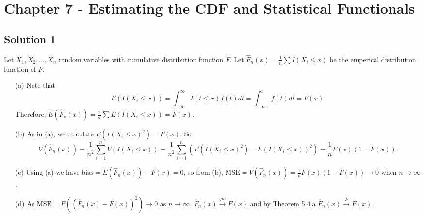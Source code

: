 \section*{Chapter 7 - Estimating the CDF and Statistical Functionals}

\subsection*{Solution 1}

Let $X_1, X_2, ..., X_n$ random variables with cumulative distribution function $F$.
Let $\hat{F}_n(x) = \frac{1}{n} \sum I(X_i \leq x)$ be the emperical distribution function of $F$.
\begin{itemize}
    \item[(a)] Note that
        \begin{equation*}
            E(I(X_i \leq x)) = \int_{-\infty}^{\infty} I(t \leq x) f(t) dt
                = \int_{-\infty}^{x} f(t) dt
                = F(x).
        \end{equation*}
        Therefore, $E(\hat{F}_n(x)) = \frac{1}{n} \sum E(I(X_i \leq x)) = F(x)$.
    \item[(b)] As in (a), we calculate $E(I(X_i \leq x)^2) = F(x)$.
        So
        \begin{equation*}
            V(\hat{F}_n(x)) = \frac{1}{n^2} \sum_{i = 1}^n V(I(X_i \leq x))
                = \frac{1}{n^2} \sum_{i = 1}^n (E(I(X_i \leq x)^2) - E(I(X_i \leq x))^2)
                = \frac{1}{n} F(x) (1 - F(x)).
        \end{equation*}
    \item[(c)] Using (a) we have $\mathrm{bias} = E(\hat{F}_n(x)) - F(x) = 0$, so from (b), $\mathrm{MSE} = V(\hat{F}_n(x)) = \frac{1}{n} F(x) (1 - F(x)) \to 0$ when $n \to \infty$.
    \item[(d)] As $\mathrm{MSE} = E((\hat{F}_n(x) - F(x))^2) \to 0$ as $n \to \infty$, $\hat{F}_n(x) \xrightarrow{qm} F(x)$ and by Theorem 5.4.a $\hat{F}_n(x) \xrightarrow{P} F(x)$.
\end{itemize}
